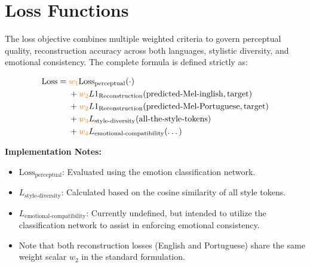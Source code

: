 \documentclass[11pt]{article}
\begin{document}
\vspace{0.5cm}
\begin{center}
\end{center}

\section{Loss Functions}

The loss objective combines multiple weighted criteria to govern perceptual quality, reconstruction accuracy across both languages, stylistic diversity, and emotional consistency. The complete formula is defined strictly as:

\[
\begin{aligned}
\text{Loss} = \;& \color{orange}w_1 \color{black}\text{Loss}_{\text{perceptual}}(\cdot) \\
& + \color{orange}w_2 \color{black} L1_{\text{Reconstruction}}(\text{predicted-Mel-inglish}, \text{target}) \\
& + \color{orange}w_2 \color{black} L1_{\text{Reconstruction}}(\text{predicted-Mel-Portuguese}, \text{target}) \\
& + \color{orange}w_3 \color{black} L_{\text{style-diversity}}(\text{all-the-style-tokens}) \\
& + \color{orange}w_4 \color{black} L_{\text{emotional-compatibility}}(\dots)
\end{aligned}
\]

\textbf{Implementation Notes:}
\begin{itemize}
    \item $\text{Loss}_{\text{perceptual}}$: Evaluated using the emotion classification network.
    \item $L_{\text{style-diversity}}$: Calculated based on the cosine similarity of all style tokens.
    \item $L_{\text{emotional-compatibility}}$: Currently undefined, but intended to utilize the classification network to assist in enforcing emotional consistency.
    \item Note that both reconstruction losses (English and Portuguese) share the same weight scalar $w_2$ in the standard formulation.
\end{itemize}
\end{document}
